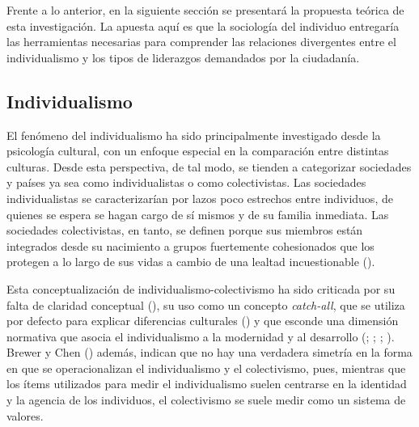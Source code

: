 \documentclass[
  letterpaper,
  DIV=11,
  numbers=noendperiod]{scrartcl}
\begin{document}
Frente a lo anterior, en la siguiente sección se presentará la propuesta
teórica de esta investigación. La apuesta aquí es que la sociología del
individuo entregaría las herramientas necesarias para comprender las
relaciones divergentes entre el individualismo y los tipos de liderazgos
demandados por la ciudadanía.

\subsection*{Individualismo}\label{individualismo}

El fenómeno del individualismo ha sido principalmente investigado desde
la psicología cultural, con un enfoque especial en la comparación entre
distintas culturas. Desde esta perspectiva, de tal modo, se tienden a
categorizar sociedades y países ya sea como individualistas o como
colectivistas. Las sociedades individualistas se caracterizarían por
lazos poco estrechos entre individuos, de quienes se espera se hagan
cargo de sí mismos y de su familia inmediata. Las sociedades
colectivistas, en tanto, se definen porque sus miembros están integrados
desde su nacimiento a grupos fuertemente cohesionados que los protegen a
lo largo de sus vidas a cambio de una lealtad incuestionable
().

Esta conceptualización de individualismo-colectivismo ha sido criticada
por su falta de claridad conceptual
(), su
uso como un concepto \emph{catch-all}, que se utiliza por defecto para
explicar diferencias culturales () y que esconde una dimensión normativa que asocia el
individualismo a la modernidad y al desarrollo
(;
;
;
). Brewer y Chen
() además, indican que no hay una
verdadera simetría en la forma en que se operacionalizan el
individualismo y el colectivismo, pues, mientras que los ítems
utilizados para medir el individualismo suelen centrarse en la identidad
y la agencia de los individuos, el colectivismo se suele medir como un
sistema de valores.
\end{document}

